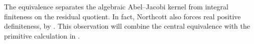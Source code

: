 The equivalence separates the algebraic Abel--Jacobi kernel from
integral finiteness on the residual quotient. In fact, Northcott
also forces real positive definiteness, by
. This observation will combine the
central equivalence with the primitive calculation in
.
